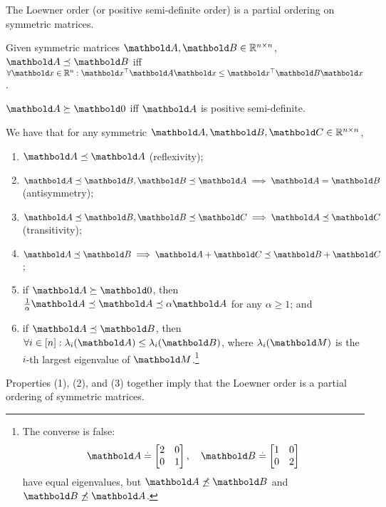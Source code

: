 The Loewner order (or positive semi-definite order) is a partial ordering on symmetric matrices.

\begin{defn}
Given symmetric matrices $\mA, \mB \in \R^{n \times n}$, $\mA \preceq \mB$ iff $\forall \vx \in \R^n: \trans{\vx}\mA\vx \leq \trans{\vx}\mB\vx$.
\end{defn}
\begin{rmk}
$\mA \succeq \mZero$ iff $\mA$ is positive semi-definite.
\end{rmk}

\begin{lem} We have that for any symmetric $\mA, \mB, \mC \in \R^{n \times n}$,
\begin{enumerate}
    \item $\mA \preceq \mA$ (reflexivity);
    \item $\mA \preceq \mB, \mB \preceq \mA \implies \mA = \mB$ (antisymmetry);
    \item $\mA \preceq \mB, \mB \preceq \mC \implies \mA \preceq \mC$ (transitivity);
    \item $\mA \preceq \mB \implies \mA + \mC \preceq \mB + \mC$;
    \item if $\mA \succeq \mZero$, then $\frac{1}{\alpha}\mA \preceq \mA \preceq \alpha\mA$ for any $\alpha \geq 1$; and
    \item if $\mA \preceq \mB$, then $\forall i \in [n]: \lambda_i(\mA) \leq \lambda_i(\mB)$, where $\lambda_i(\mM)$ is the $i$-th largest eigenvalue of $\mM$.\footnote{The converse is false: \begin{align*}
        \mA \defeq \begin{bmatrix}
            2 & 0 \\
            0 & 1 \\
        \end{bmatrix}, \quad \mB \defeq \begin{bmatrix}
            1 & 0 \\
            0 & 2 \\
        \end{bmatrix}
    \end{align*} have equal eigenvalues, but $\mA \not\preceq \mB$ and $\mB \not\preceq \mA$.}
\end{enumerate}
\end{lem}
\begin{rmk}
Properties (1), (2), and (3) together imply that the Loewner order is a partial ordering of symmetric matrices.
\end{rmk}
